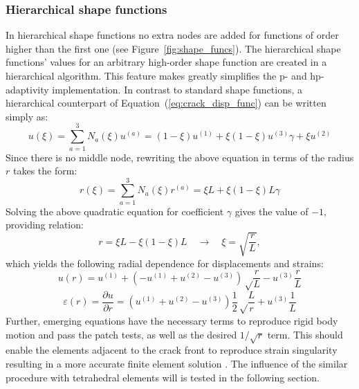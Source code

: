 \documentclass[11pt]{acmeArticle}
\numberwithin{equation}{section}
\begin{document}
\subsubsection{Hierarchical shape functions}
In hierarchical shape functions \citep{Ainsworth2003} no extra nodes are added for functions of order higher than the first one (see Figure~\ref{fig:shape_funcs}). The hierarchical shape functions' values for an arbitrary high-order shape function are created in a hierarchical algorithm. This feature makes greatly simplifies the p- and hp- adaptivity implementation. In contrast to standard shape functions, a hierarchical counterpart of Equation~(\ref{eq:crack_disp_func}) can be written simply as:
\begin{equation}
u(\xi) = \sum_{a=1}^3 N_a (\xi) u^{(a)} = (1 -\xi)u^{(1)} + \xi(1 - \xi)u^{(3)}\gamma + \xi u^{(2)}
\end{equation}
Since there is no middle node, rewriting the above equation in terms of the radius $r$ takes the form:
\begin{equation}
r(\xi) = \sum_{a=1}^3 N_a (\xi) r^{(a)} = \xi L + \xi(1-\xi)  L  \gamma
\end{equation}
Solving the above quadratic equation for coefficient $\gamma$ gives the value of $-1$, providing relation:
\begin{equation}
r= \xi L - \xi(1-\xi)L \quad \rightarrow \quad \xi = \sqrt{\frac{r}{L}},
\end{equation}
which yields the following radial dependence for displacements and strains:
\begin{equation*}
u(r) = u^{(1)} + \left( -u^{(1)} + u^{(2)} - u^{(3)} \right) \sqrt \frac{r}{L} - u^{(3)} \frac{r}{L}
\end{equation*}
\begin{equation}
\varepsilon(r) = \frac{\partial u}{\partial r} = \left( u^{(1)}  + u^{(2)} - u^{(3)}  \right) \frac{1}{2} \sqrt \frac{L}{r} + u^{(3)} \frac{1}{L}
\end{equation}
Further, emerging equations have the necessary terms to reproduce rigid body motion and pass the patch tests, as well as the desired $1 / \sqrt r$ term.
This should enable the elements adjacent to the crack front to reproduce strain singularity resulting in a more accurate finite element solution \citep{nejati2015use}. 
The influence of the similar procedure with tetrahedral elements will is tested in the following section.
\end{document}
